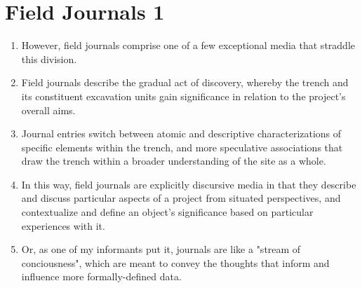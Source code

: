 \documentclass[12pt]{article}
\begin{document}
\section{Field Journals 1}
\begin{enumerate}
  \item However, field journals comprise one of a few exceptional media that straddle this division.
  \item Field journals describe the gradual act of discovery, whereby the trench and its constituent excavation units gain significance in relation to the project's overall aims.
  \item Journal entries switch between atomic and descriptive characterizations of specific elements within the trench, and more speculative associations that draw the trench within a broader understanding of the site as a whole.
  \item In this way, field journals are explicitly discursive media in that they describe and discuss particular aspects of a project from situated perspectives, and contextualize and define an object's significance based on particular experiences with it.
  \item Or, as one of my informants put it, journals are like a "stream of conciousness", which are meant to convey the thoughts that inform and influence more formally-defined data.
\end{enumerate}
  
\end{document}
